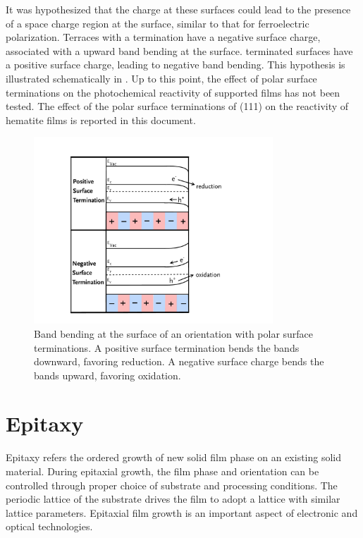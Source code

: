 It was hypothesized that the charge at these surfaces could lead to the presence of a
space charge region at the surface, similar to that for ferroelectric polarization.
Terraces with a  termination have a negative surface charge, associated with
a upward band bending at the surface.  terminated surfaces have a positive
surface charge, leading to negative band bending. This hypothesis is illustrated
schematically in . Up to this point, the effect of polar
surface terminations on the photochemical reactivity of supported films has not been
tested. The effect of the polar surface terminations of (111)  on the
reactivity of hematite films is reported in this document.
\begin{figure}
	\centerline{\includegraphics[width=0.8\textwidth]{polarterminations.pdf}}
	\caption[Band bending arising from polar surface terminations]{%
		Band bending at the surface of an orientation with polar surface 
		terminations. A positive surface termination bends the bands 
		downward, favoring reduction. A negative surface charge bends the 
		bands upward, favoring oxidation.}
	\label{fig:polarterminations}
\end{figure}


\section{Epitaxy}
\label{sec:background.epitaxy}


Epitaxy refers the ordered growth of new solid film phase on an existing solid
material.\cite{Opel:2012ge,Herman:2004to,Hooks:2001vy} During epitaxial growth, the  film
phase and orientation can be controlled through proper choice of substrate and processing
conditions. The periodic lattice of the substrate drives the film to adopt a lattice with
similar lattice parameters. Epitaxial film growth is an important aspect of electronic and
optical technologies.

